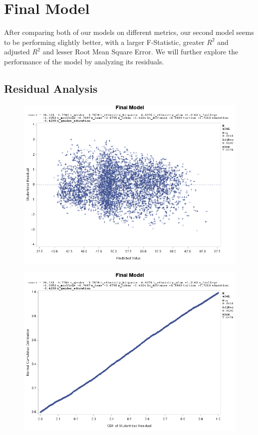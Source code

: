 \documentclass[12pt]{article}
\begin{document}
\section{Final Model}
After comparing both of our models on different metrics, our second model seems to be performing slightly better, with a larger F-Statistic, greater $R^2$ and adjusted $R^2$ and lesser Root Mean Square Error. We will further explore the performance of the model by analyzing its residuals.

\subsection{Residual Analysis}
\begin{figure}[h]
    \centering
    \begin{minipage}[t]{0.5\textwidth}
        \vspace{0pt}
        \centering
        \includegraphics[width=\textwidth]{images/final_resid_pred.png}
        \label{fig:unemp_dist}
    \end{minipage}\hfill
    \begin{minipage}[t]{0.5\textwidth}
        \vspace{0pt}
        \centering
        \includegraphics[width=\textwidth]{images/final_resid_cdf_ncd.png}
        

\end{minipage}
\end{figure}
\end{document}
